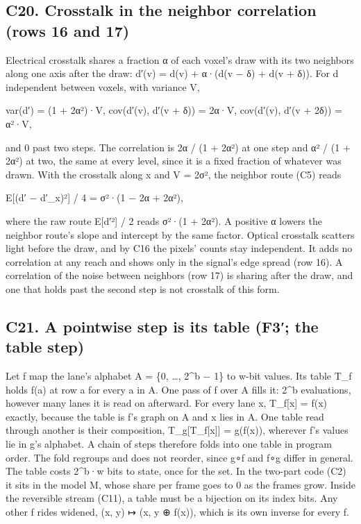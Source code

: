 \subsection{\texorpdfstring{C20. Crosstalk in the neighbor correlation (rows 16 and 17)}{C20. Crosstalk in the neighbor correlation (rows 16 and 17)}}

Electrical crosstalk shares a fraction α of each voxel's draw with its two neighbors along one axis after the draw: d′(v) = d(v) + α·(d(v − δ) + d(v + δ)). For d independent between voxels, with variance V,

var(d′) = (1 + 2α²)·V,  cov(d′(v), d′(v + δ)) = 2α·V,  cov(d′(v), d′(v + 2δ)) = α²·V,

and 0 past two steps. The correlation is 2α / (1 + 2α²) at one step and α² / (1 + 2α²) at two, the same at every level, since it is a fixed fraction of whatever was drawn. With the crosstalk along x and V = 2σ², the neighbor route (C5) reads

E[(d′ − d′\_\allowbreak{}x)²] / 4 = σ²·(1 − 2α + 2α²),

where the raw route E[d′²] / 2 reads σ²·(1 + 2α²). A positive α lowers the neighbor route's slope and intercept by the same factor. Optical crosstalk scatters light before the draw, and by C16 the pixels' counts stay independent. It adds no correlation at any reach and shows only in the signal's edge spread (row 16). A correlation of the noise between neighbors (row 17) is sharing after the draw, and one that holds past the second step is not crosstalk of this form.

\subsection{\texorpdfstring{C21. A pointwise step is its table (F3′; the table step)}{C21. A pointwise step is its table (F3′; the table step)}}

Let f map the lane's alphabet A = \{0, …, 2\textasciicircum{}b − 1\} to w-bit values. Its table T\_\allowbreak{}f holds f(a) at row a for every a in A. One pass of f over A fills it: 2\textasciicircum{}b evaluations, however many lanes it is read on afterward. For every lane x, T\_\allowbreak{}f[x] = f(x) exactly, because the table is f's graph on A and x lies in A. One table read through another is their composition, T\_\allowbreak{}g[T\_\allowbreak{}f[x]] = g(f(x)), wherever f's values lie in g's alphabet. A chain of steps therefore folds into one table in program order. The fold regroups and does not reorder, since g∘f and f∘g differ in general. The table costs 2\textasciicircum{}b·w bits to state, once for the set. In the two-part code (C2) it sits in the model M, whose share per frame goes to 0 as the frames grow. Inside the reversible stream (C11), a table must be a bijection on its index bits. Any other f rides widened, (x, y) ↦ (x, y ⊕ f(x)), which is its own inverse for every f.

